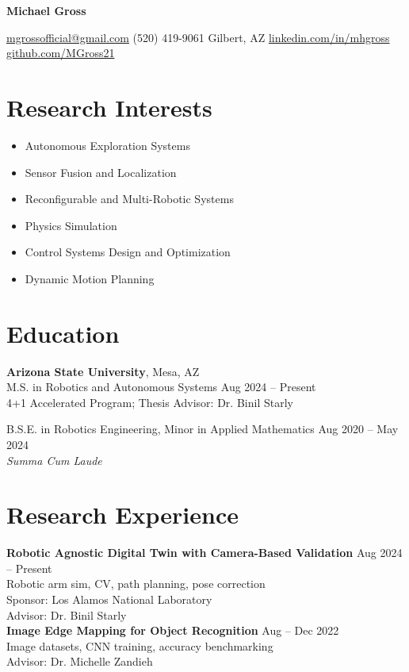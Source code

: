 \documentclass[10pt]{article}
\begin{document}
\centerline{\LARGE\textbf{Michael Gross}}
\centerline{\href{mailto:mgrossofficial@gmail.com}{mgrossofficial@gmail.com} \textbar{} (520) 419-9061 \textbar{} Gilbert, AZ \textbar{} \href{https://www.linkedin.com/in/mhgross}{linkedin.com/in/mhgross} \textbar{} \href{https://github.com/MGross21}{github.com/MGross21}}

\vspace{-0.5em}
\section*{Research Interests}
\vspace{-0.7em}
\begin{multicols}{2}
  \begin{itemize}[leftmargin=1.2em]
    \item Autonomous Exploration Systems
    \item Sensor Fusion and Localization
    \item Reconfigurable and Multi-Robotic Systems
    \item Physics Simulation
    \item Control Systems Design and Optimization
    \item Dynamic Motion Planning
  \end{itemize}
\end{multicols}
\vspace{-0.7em}

\section*{Education}
\textbf{Arizona State University}, Mesa, AZ\\
M.S. in Robotics and Autonomous Systems \hfill Aug 2024 -- Present\\
4+1 Accelerated Program; Thesis Advisor: Dr. Binil Starly

B.S.E. in Robotics Engineering, Minor in Applied Mathematics \hfill Aug 2020 -- May 2024\\
\textit{Summa Cum Laude}

\section*{Research Experience}
\textbf{Robotic Agnostic Digital Twin with Camera-Based Validation} \hfill Aug 2024 -- Present\\
\hspace*{2em}Robotic arm sim, CV, path planning, pose correction\\
\hspace*{2em}Sponsor: Los Alamos National Laboratory\\
\hspace*{2em}Advisor: Dr. Binil Starly \\
\textbf{Image Edge Mapping for Object Recognition} \hfill Aug -- Dec 2022\\
\hspace*{2em}Image datasets, CNN training, accuracy benchmarking\\Advisor: Dr. Michelle Zandieh
\end{document}
